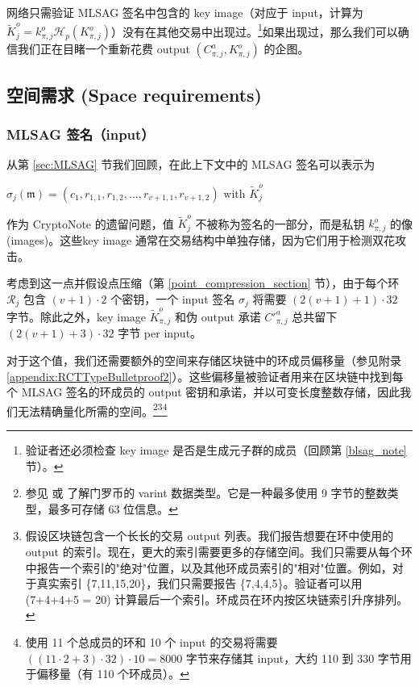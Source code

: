 {网络只需验证 MLSAG 签名中包含的 key image（对应于 input，计算为 $\tilde{K}^o_{j} = k^o_{\pi,j} \mathcal{H}_p(K^o_{\pi,j})$）没有在其他交易中出现过。\footnote{验证者还必须检查 key image 是否是生成元子群的成员（回顾第 \ref{blsag_note} 节）。}如果出现过，那么我们可以确信我们正在目睹一个重新花费 output $(C^a_{\pi,j}, K_{\pi,j}^o)$ 的企图。


\subsection{空间需求 (Space requirements)}
\label{subsec:space-and-ver-rcttypefull}

\subsubsection*{MLSAG 签名（input）}

从第 \ref{sec:MLSAG} 节我们回顾，在此上下文中的 MLSAG 签名可以表示为

\hfill \(\sigma_j(\mathfrak{m}) = (c_1, r_{1, 1}, r_{1, 2}, ..., r_{v+1, 1}, r_{v+1, 2}) \textrm{ with } \tilde{K}^o_j \) \hfill \phantom{.}

作为 CryptoNote 的遗留问题，值 \(\tilde{K}^o_j\) 不被称为签名的一部分，而是私钥 $k^o_{\pi,j}$ 的{像 (images)}。这些{key image} 通常在交易结构中单独存储，因为它们用于检测双花攻击。

考虑到这一点并假设点压缩（第 \ref{point_compression_section} 节），由于每个环 \(\mathcal{R}_j\) 包含 \((v+1) \cdot 2\) 个密钥，一个 input 签名 $\sigma_j$ 将需要 \( (2(v+1) + 1) \cdot 32  \) 字节。除此之外，key image $\tilde{K}^o_{\pi,j}$ 和伪 output 承诺 $C'^a_{\pi,j}$ 总共留下 $(2(v+1)+3) \cdot 32$ 字节 per input。

对于这个值，我们还需要额外的空间来存储区块链中的环成员偏移量（参见附录 \ref{appendix:RCTTypeBulletproof2}）。这些偏移量被验证者用来在区块链中找到每个 MLSAG 签名的环成员的 output 密钥和承诺，并以可变长度整数存储，因此我们无法精确量化所需的空间。\footnote{参见 \cite{varint-description} 或 \cite{varint-spec} 了解门罗币的 varint 数据类型。它是一种最多使用 9 字节的整数类型，最多可存储 63 位信息。}\footnote{假设区块链包含一个长长的交易 output 列表。我们报告想要在环中使用的 output 的索引。现在，更大的索引需要更多的存储空间。我们只需要从每个环中报告{一个}索引的"绝对"位置，以及其他环成员索引的"相对"位置。例如，对于真实索引 \{7,11,15,20\}，我们只需要报告 \{7,4,4,5\}。验证者可以用 (7+4+4+5 = 20) 计算最后一个索引。环成员在环内按区块链索引升序排列。}\footnote{使用 11 个总成员的环和 10 个 input 的交易将需要 \(((11 \cdot 2 + 3) \cdot 32) \cdot 10 = 8000 \) 字节来存储其 input，大约 110 到 330 字节用于偏移量（有 110 个环成员）。}%

}
